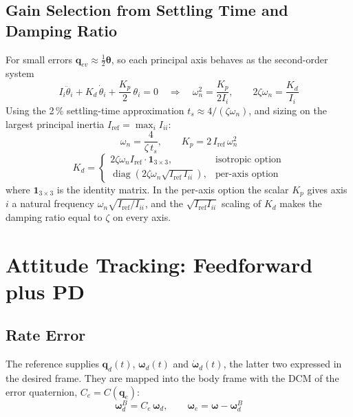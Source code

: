 \documentclass[11pt, a4paper]{article}
\newcommand{\vect}[1]{\boldsymbol{#1}}
\newcommand{\w}{\vect{\omega}}
\newcommand{\diag}{\operatorname{diag}}
\begin{document}
\subsection{Gain Selection from Settling Time and Damping Ratio}
For small errors $\vect{q}_{ev} \approx \tfrac{1}{2}\vect{\theta}$, so each principal axis behaves as the second-order system
\begin{equation}
I_i \ddot{\theta}_i + K_d\, \dot{\theta}_i + \frac{K_p}{2}\, \theta_i = 0
\quad\Longrightarrow\quad
\omega_n^2 = \frac{K_p}{2 I_i}, \qquad 2 \zeta \omega_n = \frac{K_d}{I_i}
\end{equation}
Using the 2\,\% settling-time approximation $t_s \approx 4 / (\zeta \omega_n)$, and sizing on the largest principal inertia $I_{\text{ref}} = \max_i I_{ii}$:
\begin{equation}
\omega_n = \frac{4}{\zeta\, t_s},
\qquad
K_p = 2\, I_{\text{ref}}\, \omega_n^2
\end{equation}
\begin{equation}
K_d =
\begin{cases}
2 \zeta \omega_n I_{\text{ref}} \cdot \mathbf{1}_{3 \times 3}, & \text{isotropic option} \\[1ex]
\diag\!\left( 2 \zeta \omega_n \sqrt{I_{\text{ref}}\, I_{ii}} \right), & \text{per-axis option}
\end{cases}
\end{equation}
where $\mathbf{1}_{3\times3}$ is the identity matrix. In the per-axis option the scalar $K_p$ gives axis $i$ a natural frequency $\omega_n \sqrt{I_{\text{ref}}/I_{ii}}$, and the $\sqrt{I_{\text{ref}} I_{ii}}$ scaling of $K_d$ makes the damping ratio equal to $\zeta$ on every axis.

\section{Attitude Tracking: Feedforward plus PD}

\subsection{Rate Error}
The reference supplies $\vect{q}_d(t)$, $\w_d(t)$ and $\dot{\w}_d(t)$, the latter two expressed in the desired frame. They are mapped into the body frame with the DCM of the error quaternion, $C_e = C(\vect{q}_e)$:
\begin{equation}
\w_d^B = C_e\, \w_d,
\qquad
\w_e = \w - \w_d^B
\end{equation}
\end{document}
